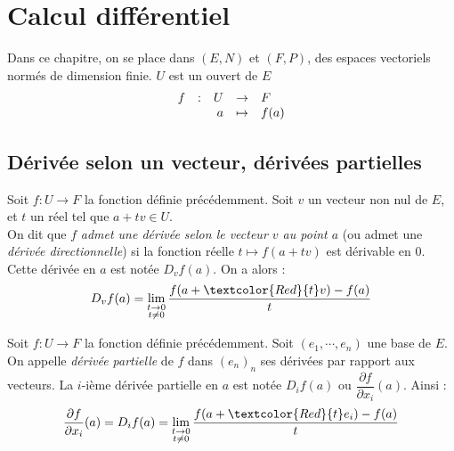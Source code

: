 \documentclass[11pt,a4paper,fleqn,pdftex]{report}
\begin{document}
\chapter{Calcul différentiel} %
\label{cha:calcul_differentiel}
Dans ce chapitre, on se place dans $\left( E, N \right)$ et $\left( F,P \right)$, des espaces vectoriels normés de dimension finie. $U$ est un ouvert de $E$
\[
    \begin{array}{r c r c l}
    f&:& U &\to & F \\
     & & a &\mapsto & f(a)
    \end{array}
\]
\section{Dérivée selon un vecteur, dérivées partielles} %
\label{sec:derivee_selon_un_vecteur_derivees_partielles}
\begin{dfn}
     Soit $f:U\to F$ la fonction définie précédemment.\newline
    Soit $v$ un vecteur non nul de $E$, et $t$ un réel tel que $a+tv \in U$. \\
    On dit que $f$ \emph{admet une dérivée selon le vecteur $v$ au point $a$} (ou admet une \emph{dérivée directionnelle}) si la fonction réelle $t\mapsto f(a+tv)$ est dérivable en $0$. Cette dérivée en $a$ est notée $D_vf(a)$. \newline
    On a alors : 
    \begin{equation}
    D_vf(a)=\lim_{\substack{t\rightarrow 0\\ t\neq 0}}\dfrac{f(a+\textcolor{Red}{t}v) - f(a)}{t}
    \end{equation}
\end{dfn}
\begin{dfn}
     Soit $f:U\to F$ la fonction définie précédemment.\newline
     Soit $(e_1, \cdots ,e_n)$ une base de $E$. On appelle \emph{dérivée partielle} de $f$ dans $(e_n)_n$ ses dérivées par rapport aux vecteurs. La $i$-ième dérivée partielle en $a$ est notée $D_if(a)$ ou $\dfrac{\partial f}{\partial x_i}(a)$. Ainsi : 
     \begin{equation}
     \dfrac{\partial f}{\partial x_i}(a)=D_if(a)=\lim_{\substack{t\rightarrow 0\\ t\neq 0}}\dfrac{f(a+\textcolor{Red}{t}e_i) - f(a)}{t}
     \end{equation}
\end{dfn}
\needspace{3cm}
\end{document}
